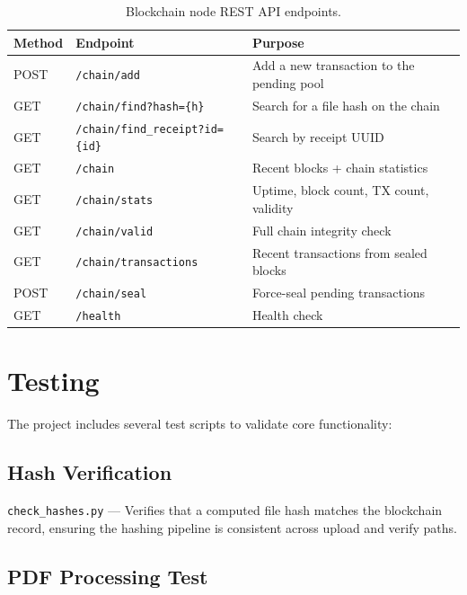 \documentclass[12pt, a4paper]{report}
\begin{document}
\begin{table}[H]
\centering
\begin{tabularx}{\textwidth}{l l X}
\toprule
\textbf{Method} & \textbf{Endpoint} & \textbf{Purpose} \\
\midrule
POST & \texttt{/chain/add} & Add a new transaction to the pending pool \\
GET & \texttt{/chain/find?hash=\{h\}} & Search for a file hash on the chain \\
GET & \texttt{/chain/find\_receipt?id=\{id\}} & Search by receipt UUID \\
GET & \texttt{/chain} & Recent blocks + chain statistics \\
GET & \texttt{/chain/stats} & Uptime, block count, TX count, validity \\
GET & \texttt{/chain/valid} & Full chain integrity check \\
GET & \texttt{/chain/transactions} & Recent transactions from sealed blocks \\
POST & \texttt{/chain/seal} & Force-seal pending transactions \\
GET & \texttt{/health} & Health check \\
\bottomrule
\end{tabularx}
\caption{Blockchain node REST API endpoints.}
\end{table}


\chapter{Testing}

The project includes several test scripts to validate core functionality:

\section{Hash Verification}

\texttt{check\_hashes.py} — Verifies that a computed file hash matches the
blockchain record, ensuring the hashing pipeline is consistent across upload
and verify paths.

\section{PDF Processing Test}
\end{document}
